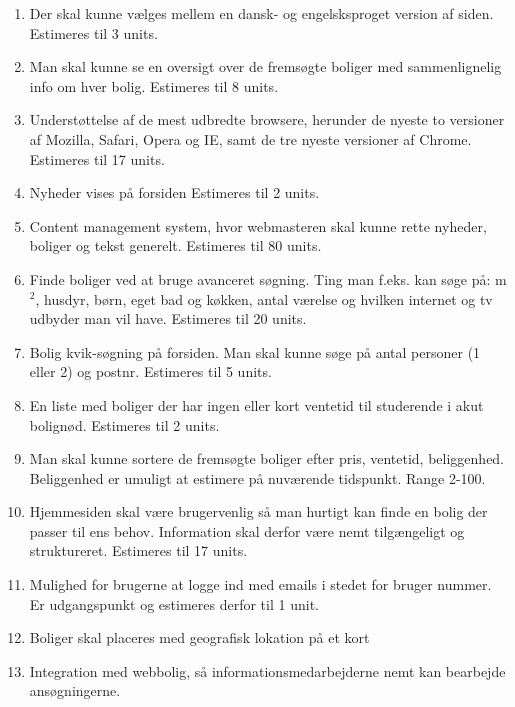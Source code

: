 \documentclass[12pt, a4paper]{report}
\begin{document}
\begin{enumerate}

\item Der skal kunne vælges mellem en dansk- og engelsksproget version af siden. Estimeres til 3 units.

\item Man skal kunne se en oversigt over de fremsøgte boliger med sammenlignelig info om hver bolig. Estimeres til 8 units.

\item Understøttelse af de mest udbredte browsere, herunder de nyeste to versioner af Mozilla, Safari, Opera og IE, samt de tre nyeste versioner af Chrome. Estimeres til 17 units.

\item Nyheder vises på forsiden Estimeres til 2 units.

\item Content management system, hvor webmasteren skal kunne rette nyheder, boliger og tekst generelt. Estimeres til 80 units.

\item Finde boliger ved at bruge avanceret søgning. Ting man f.eks. kan søge på: m$^{2}$, husdyr, børn, eget bad og køkken, antal værelse og hvilken internet og tv udbyder man vil have. Estimeres til 20 units.

\item Bolig kvik-søgning på forsiden. Man skal kunne søge på antal personer (1 eller 2) og postnr. Estimeres til 5 units.

\item En liste med boliger der har ingen eller kort ventetid til studerende i akut bolignød. Estimeres til 2 units.

\item Man skal kunne sortere de fremsøgte boliger efter pris, ventetid, beliggenhed. Beliggenhed er umuligt at estimere på nuværende tidspunkt. Range 2-100.

\item Hjemmesiden skal være brugervenlig så man hurtigt kan finde en bolig der passer til ens behov. Information skal derfor være nemt tilgængeligt og struktureret. Estimeres til 17 units.

\item Mulighed for brugerne at logge ind med emails i stedet for bruger nummer. Er udgangspunkt og estimeres derfor til 1 unit.

\item Boliger skal placeres med geografisk lokation på et kort

\item Integration med webbolig, så informationsmedarbejderne nemt kan bearbejde ansøgningerne.

\end{enumerate}
\end{document}
